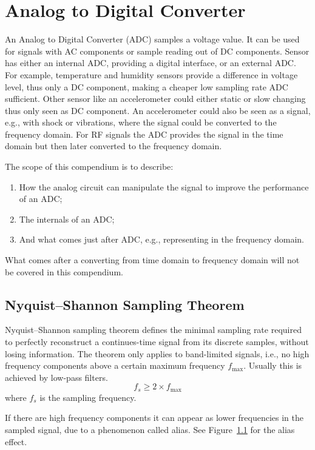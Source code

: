 \chapter{Analog to Digital Converter}

An Analog to Digital Converter (ADC) samples a voltage value. It can be used for signals with AC components or sample reading out of DC components. Sensor has either an internal ADC, providing a digital interface, or an external ADC. For example, temperature and humidity sensors provide a difference in voltage level, thus only a DC component, making a cheaper low sampling rate ADC sufficient. Other sensor like an accelerometer could either static or slow changing thus only seen as DC component. An accelerometer could also be seen as a signal, e.g., with shock or vibrations, where the signal could be converted to the frequency domain. For RF signals the ADC provides the signal in the time domain but then later converted to the frequency domain.


The scope of this compendium is to describe: 
\begin{enumerate}
  \item How the analog circuit can manipulate the signal to improve the performance of an ADC;
  \item The internals of an ADC;
  \item And what comes just after ADC, e.g., representing in the frequency domain.
\end{enumerate}
What comes after a converting from time domain to frequency domain will not be covered in this compendium.

\section{Nyquist–Shannon Sampling Theorem}
Nyquist–Shannon sampling theorem defines the minimal sampling rate required to perfectly reconstruct a continues-time signal from its discrete samples, without losing information.
The theorem only applies to band-limited signals, i.e., no high frequency components above a certain maximum frequency $f_{\text{max}}$. Usually this is achieved by low-pass filters.
\begin{equation}
  f_s \geq 2 \times f_{\text{max}}
\end{equation}
where $f_s$ is the sampling frequency.


If there are high frequency components it can appear as lower frequencies in the sampled signal, due to a phenomenon called alias. See Figure~\ref{} for the alias effect.


